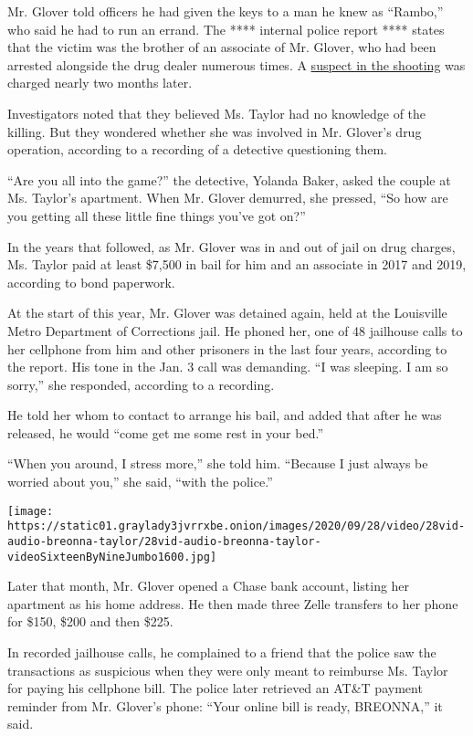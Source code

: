 Mr. Glover told officers he had given the keys to a man he knew as
``Rambo,'' who said he had to run an errand. The **** internal police
report **** states that the victim was the brother of an associate of
Mr. Glover, who had been arrested alongside the drug dealer numerous
times. A
\href{https://www.courier-journal.com/story/news/crime/2017/02/01/louisville-man-arrested-murder-drug-charges/97329308/}{suspect
in the shooting} was charged nearly two months later.

Investigators noted that they believed Ms. Taylor had no knowledge of
the killing. But they wondered whether she was involved in Mr. Glover's
drug operation, according to a recording of a detective questioning
them.

``Are you all into the game?'' the detective, Yolanda Baker, asked the
couple at Ms. Taylor's apartment. When Mr. Glover demurred, she pressed,
``So how are you getting all these little fine things you've got on?''

In the years that followed, as Mr. Glover was in and out of jail on drug
charges, Ms. Taylor paid at least \$7,500 in bail for him and an
associate in 2017 and 2019, according to bond paperwork.

At the start of this year, Mr. Glover was detained again, held at the
Louisville Metro Department of Corrections jail. He phoned her, one of
48 jailhouse calls to her cellphone from him and other prisoners in the
last four years, according to the report. His tone in the Jan. 3 call
was demanding. ``I was sleeping. I am so sorry,'' she responded,
according to a recording.

He told her whom to contact to arrange his bail, and added that after he
was released, he would ``come get me some rest in your bed.''

``When you around, I stress more,'' she told him. ``Because I just
always be worried about you,'' she said, ``with the police.''

\texttt{[image: https://static01.graylady3jvrrxbe.onion/images/2020/09/28/video/28vid-audio-breonna-taylor/28vid-audio-breonna-taylor-videoSixteenByNineJumbo1600.jpg]}

Later that month, Mr. Glover opened a Chase bank account, listing her
apartment as his home address. He then made three Zelle transfers to her
phone for \$150, \$200 and then \$225.

In recorded jailhouse calls, he complained to a friend that the police
saw the transactions as suspicious when they were only meant to
reimburse Ms. Taylor for paying his cellphone bill. The police later
retrieved an AT\&T payment reminder from Mr. Glover's phone: ``Your
online bill is ready, BREONNA,'' it said.

